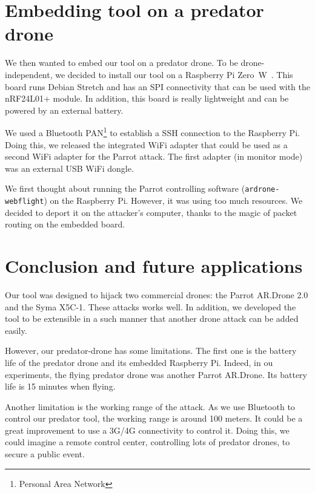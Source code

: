 \documentclass[conference,a4paper]{IEEEtran}
\newcommand{\myv}[1]{\texttt{\small#1}}
\begin{document}
\section{Embedding tool on a predator drone}
We then wanted to embed our tool on a predator drone. To be drone-independent, we decided
to install our tool on a Raspberry Pi Zero~W~\cite{bib:rpi0w}. This board runs Debian
Stretch and has an SPI connectivity that can be used with the nRF24L01+ module. In
addition, this board is really lightweight and can be powered by an external battery.

We used a Bluetooth PAN\footnote{Personal Area Network} to establish a SSH connection to
the Raspberry Pi. Doing this, we released the integrated WiFi adapter that could be used
as a second WiFi adapter for the Parrot attack. The first adapter (in monitor mode) was an
external USB WiFi dongle.

We first thought about running the Parrot controlling software (\myv{ardrone-webflight})
on the Raspberry Pi. However, it was using too much resources. We decided to deport it on
the attacker's computer, thanks to the magic of packet routing on the embedded board.



\section{Conclusion and future applications}
Our tool was designed to hijack two commercial drones: the Parrot AR.Drone 2.0 and the
Syma X5C-1. These attacks works well. In addition, we developed the tool to be extensible
in a such manner that another drone attack can be added easily.

However, our predator-drone has some limitations. The first one is the battery life of the
predator drone and its embedded Raspberry Pi. Indeed, in ou experiments, the flying
predator drone was another Parrot AR.Drone. Its battery life is 15 minutes when flying.

Another limitation is the working range of the attack. As we use Bluetooth to control our
predator tool, the working range is around 100 meters. It could be a great improvement to
use a 3G/4G connectivity to control it. Doing this, we could imagine a remote control
center, controlling lots of predator drones, to secure a public event.




\end{document}
